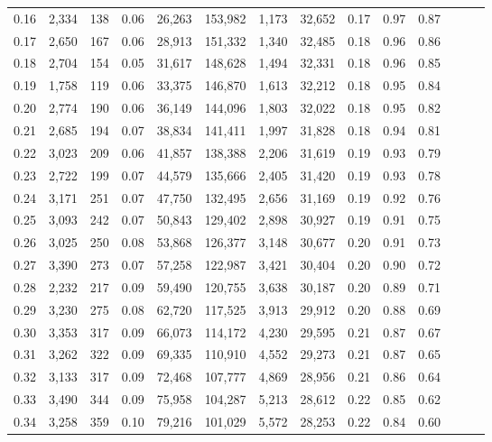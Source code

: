 \begin{tabular}{rrrrrrrrrrrrrr}
0.16 &  2,334 &  138 &  0.06 &   26,263 &  153,982 &   1,173 &  32,652 &  0.17 &  0.97 &      0.87 \\
0.17 &  2,650 &  167 &  0.06 &   28,913 &  151,332 &   1,340 &  32,485 &  0.18 &  0.96 &      0.86 \\
0.18 &  2,704 &  154 &  0.05 &   31,617 &  148,628 &   1,494 &  32,331 &  0.18 &  0.96 &      0.85 \\
0.19 &  1,758 &  119 &  0.06 &   33,375 &  146,870 &   1,613 &  32,212 &  0.18 &  0.95 &      0.84 \\
0.20 &  2,774 &  190 &  0.06 &   36,149 &  144,096 &   1,803 &  32,022 &  0.18 &  0.95 &      0.82 \\
0.21 &  2,685 &  194 &  0.07 &   38,834 &  141,411 &   1,997 &  31,828 &  0.18 &  0.94 &      0.81 \\
0.22 &  3,023 &  209 &  0.06 &   41,857 &  138,388 &   2,206 &  31,619 &  0.19 &  0.93 &      0.79 \\
0.23 &  2,722 &  199 &  0.07 &   44,579 &  135,666 &   2,405 &  31,420 &  0.19 &  0.93 &      0.78 \\
0.24 &  3,171 &  251 &  0.07 &   47,750 &  132,495 &   2,656 &  31,169 &  0.19 &  0.92 &      0.76 \\
0.25 &  3,093 &  242 &  0.07 &   50,843 &  129,402 &   2,898 &  30,927 &  0.19 &  0.91 &      0.75 \\
0.26 &  3,025 &  250 &  0.08 &   53,868 &  126,377 &   3,148 &  30,677 &  0.20 &  0.91 &      0.73 \\
0.27 &  3,390 &  273 &  0.07 &   57,258 &  122,987 &   3,421 &  30,404 &  0.20 &  0.90 &      0.72 \\
0.28 &  2,232 &  217 &  0.09 &   59,490 &  120,755 &   3,638 &  30,187 &  0.20 &  0.89 &      0.71 \\
0.29 &  3,230 &  275 &  0.08 &   62,720 &  117,525 &   3,913 &  29,912 &  0.20 &  0.88 &      0.69 \\
0.30 &  3,353 &  317 &  0.09 &   66,073 &  114,172 &   4,230 &  29,595 &  0.21 &  0.87 &      0.67 \\
0.31 &  3,262 &  322 &  0.09 &   69,335 &  110,910 &   4,552 &  29,273 &  0.21 &  0.87 &      0.65 \\
0.32 &  3,133 &  317 &  0.09 &   72,468 &  107,777 &   4,869 &  28,956 &  0.21 &  0.86 &      0.64 \\
0.33 &  3,490 &  344 &  0.09 &   75,958 &  104,287 &   5,213 &  28,612 &  0.22 &  0.85 &      0.62 \\
0.34 &  3,258 &  359 &  0.10 &   79,216 &  101,029 &   5,572 &  28,253 &  0.22 &  0.84 &      0.60 \\

\end{tabular}

